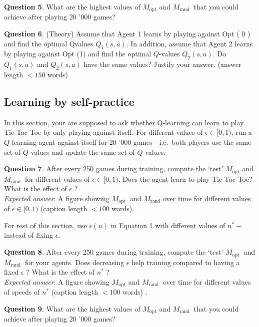 \documentclass[11pt]{article}
\begin{document}
    \textbf{Question 5}. What are the highest values of \(M_{\mathrm{opt}}\)
and \(M_{\text {rand }}\) that you could achieve after playing 20 '000
games?

    \textbf{Question 6}. (Theory) Assume that Agent 1 learns by playing
against Opt ( 0 ) and find the optimal Qvalues \(Q_{1}(s, a)\). In
addition, assume that Agent 2 learns by playing against Opt (1) and find
the optimal \(Q\)-values \(Q_{2}(s, a)\). Do \(Q_{1}(s, a)\) and
\(Q_{2}(s, a)\) have the same values? Justify your answer. (answer
length \(<150\) words)

    \hypertarget{learning-by-self-practice}{%
\subsection{Learning by self-practice}\label{learning-by-self-practice}}

    In this section, your are supposed to ask whether Q-learning can learn
to play Tic Tac Toe by only playing against itself. For different values
of \(\epsilon \in[0,1)\), run a \(Q\)-learning agent against itself for
20 '000 games - i.e.~both players use the same set of \(Q\)-values and
update the same set of \(Q\)-values.

\textbf{Question 7}. After every 250 games during training, compute the
`test' \(M_{\mathrm{opt}}\) and \(M_{\text {rand }}\) for different
values of \(\epsilon \in[0,1)\). Does the agent learn to play Tic Tac
Toe? What is the effect of \(\epsilon\) ?\\
\emph{Expected answer}: A figure showing \(M_{\text {opt }}\) and
\(M_{\text {rand}}\) over time for different values of
\(\epsilon \in[0,1)\) (caption length \(<100\) words).

For rest of this section, use \(\epsilon(n)\) in Equation 1 with
different values of \(n^{*}-\) instead of fixing \(\epsilon\).

\textbf{Question 8}. After every 250 games during training, compute the
`test' \(M_{\text {opt }}\) and \(M_{\text {rand }}\) for your agents.
Does decreasing \(\epsilon\) help training compared to having a fixed
\(\epsilon\) ? What is the effect of \(n^{*}\) ?\\
\emph{Expected answer}: A figure showing \(M_{\mathrm{opt}}\) and
\(M_{\text {rand }}\) over time for different values of speeds of
\(n^{*}\) (caption length \(<100\) words) .

\textbf{Question 9}. What are the highest values of \(M_{\mathrm{opt}}\)
and \(M_{\text {rand }}\) that you could achieve after playing 20 '000
games?
\end{document}
